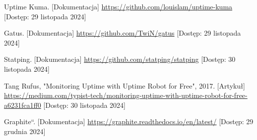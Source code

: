 \documentclass{article}
\begin{document}
\begin{thebibliography}{9}
Uptime Kuma. [Dokumentacja] \url{https://github.com/louislam/uptime-kuma} [Dostęp: 29 listopada 2024]


Gatus. [Dokumentacja] \url{https://github.com/TwiN/gatus} [Dostęp: 29 listopada 2024]


Statping. [Dokumentacja] \url{https://github.com/statping/statping} [Dostęp: 30 listopada 2024]

Tang Rufus, "Monitoring Uptime with Uptime Robot for Free", 2017. [Artykuł] \url{https://medium.com/typist-tech/monitoring-uptime-with-uptime-robot-for-free-a6231fca1ff0} [Dostęp: 30 listopada 2024]

Graphite``. [Dokumentacja] \url{https://graphite.readthedocs.io/en/latest/} [Dostęp: 29 grudnia 2024]



\end{thebibliography}
\end{document}
